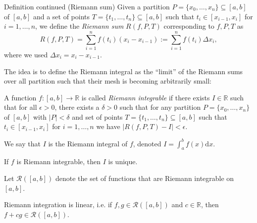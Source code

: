 \documentclass [aspectratio=169]{beamer}
\newcommand{\R}{{\mathbb{R}}}
\begin{document}
\begin{frame}
\begin{block}{Definition continued (Riemann sum)}
Given a partition $P=\{x_0, \ldots, x_n\}\subseteq [a,b]$ of $[a,b]$ and a set of points $T=\{t_1,\ldots, t_n\}\subseteq [a,b]$ such that $t_i \in [x_{i-1},x_i]$ for $i=1,\ldots, n$, we define the \emph{Riemann sum} $R(f,P,T)$ corresponding to $f,P,T$ as 
\begin{equation*}
    R(f,P,T) = \sum_{i=1}^n f(t_i) (x_i-x_{i-1}) := \sum_{i=1}^n f(t_i) \Delta x_i,
\end{equation*}
where we used $ \Delta x_i = x_i-x_{i-1}$. 

\end{block}
\end{frame}




\begin{frame}
The idea is to define the Riemann integral as the ``limit'' of the Riemann sums over all partition such that their mesh is becoming arbitrarily small:

\vspace{1em}

\begin{definition}
A function $f\colon [a,b] \to \R$ is called \emph{Riemann integrable} if there exists $I\in \R$ such that for all $\epsilon>0$, there exists a $\delta>0$ such that for any partition $P = \{x_0,\ldots,x_n \}$ of $[a,b]$ with $\vert P \vert <\delta$ and set of points $T=\{t_1,\ldots, t_n\}\subseteq [a,b]$ such that $t_i \in [x_{i-1},x_i]$ for $i=1,\ldots,n$ we have $\vert R(f,P,T) - I \vert < \epsilon$. 

We say that $I$ is the Riemann integral of $f$, denoted $I = \int_a^b f(x) \mathrm{d}x$.
\end{definition}
\vspace{1em}

If $f$ is Riemann integrable, then $I$ is unique.
\end{frame}




\begin{frame}
Let $\mathcal{R}([a,b])$ denote the set of functions that are Riemann integrable on $[a,b]$.

\vspace{2em}

\begin{theorem}
Riemann integration is linear, i.e. if $f,g \in \mathcal{R}([a,b])$ and $c \in \R$, then $f+ cg \in \mathcal{R}([a,b])$.
\end{theorem}
\end{frame}
\end{document}
